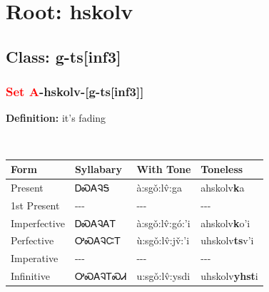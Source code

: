 \needspace{4in}
\section*{Root: hskolv}
\nopagebreak
{}
\needspace{3in}
\subsection*{Class: g-ts[inf3]}
\nopagebreak
\needspace{2in}
\subsubsection*{\textcolor{Red}{Set A}{-}\textbf{hskolv}{-}[g-ts[inf3]]}
\nopagebreak
\textbf{Definition: } it{\textquoteright}s fading
\\[0.5em]
\begin{tabularx}{\textwidth}{l X X X}%
\toprule%
\textbf{Form}&\textbf{Syllabary}&\textbf{With Tone}&\textbf{Toneless}\\%
\midrule%
Present&ᎠᏍᎪᎸᎦ&à:sgǒ:lv̂:ga&ahskolv\textbf{k}a\\%
1st Present&{-}{-}{-}&{-}{-}{-}&{-}{-}{-}\\%
Imperfective&ᎠᏍᎪᎸᎪᎢ&à:sgǒ:lv̂:gó:’i&ahskolv\textbf{k}o'i\\%
Perfective&ᎤᏍᎪᎸᏨᎢ&ù:sgǒ:lv̂:jv̌:’i&uhskolv\textbf{ts}v'i\\%
Imperative&{-}{-}{-}&{-}{-}{-}&{-}{-}{-}\\%
Infinitive&ᎤᏍᎪᎸᎢᏍᏗ&u:sgǒ:lv̂:ysdi&uhskolv\textbf{yhst}i\\%
\bottomrule%
\end{tabularx}
\\[1em]